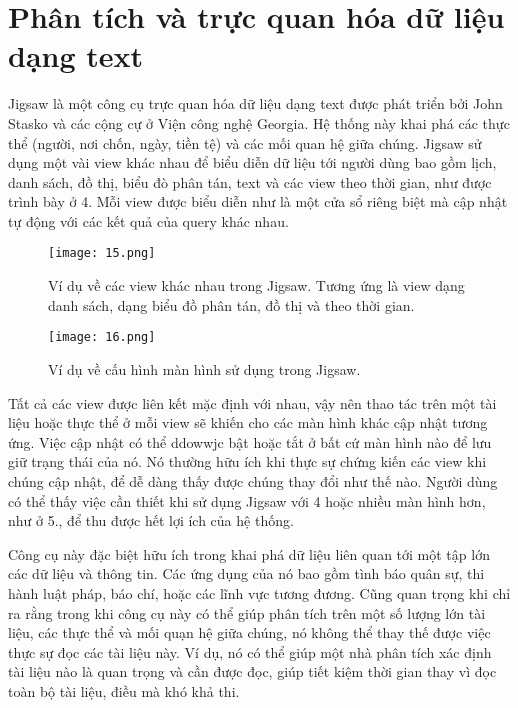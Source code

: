 \documentclass[13pt]{scrartcl} %
\begin{document}
\section{Phân tích và trực quan hóa dữ liệu dạng text}
Jigsaw là một công cụ trực quan hóa dữ liệu dạng text được phát triển bởi John Stasko và các cộng cự ở Viện công nghệ Georgia. Hệ thống này khai phá các thực thể (người, nơi chốn, ngày, tiền tệ) và các mối quan hệ giữa chúng. Jigsaw sử dụng một vài view khác nhau để biểu diễn dữ liệu tới người dùng bao gồm lịch, danh sách, đồ thị, biểu đò phân tán, text và các view theo thời gian, như được trình bày ở 4. Mỗi view được biểu diễn như là một cửa sổ riêng biệt mà cập nhật tự động với các kết quả của query khác nhau.


\begin{figure}[!ht] %
    \centering
    \texttt{[image: 15.png]}
    \caption{Ví dụ về các view khác nhau trong Jigsaw. Tương ứng là view dạng danh sách, dạng biểu đồ phân tán, đồ thị và theo thời gian.}
\end{figure}

\begin{figure}[!ht] %
    \centering
    \texttt{[image: 16.png]}
    \caption{Ví dụ về cấu hình màn hình sử dụng trong Jigsaw. }
\end{figure}

Tất cả các view được liên kết mặc định với nhau, vậy nên thao tác trên một tài liệu hoặc thực thể ở mỗi view sẽ khiến cho các màn hình khác cập nhật tương ứng. Việc cập nhật có thể ddowwjc bật hoặc tắt ở bất cứ màn hình nào để lưu giữ trạng thái của nó. Nó thường hữu ích khi thực sự chứng kiến các view khi chúng cập nhật, để dễ dàng thấy được chúng thay đổi như thế nào. Người dùng có thể thấy việc cần thiết khi sử dụng Jigsaw với 4 hoặc nhiều màn hình hơn, như ở 5., để thu được hết lợi ích của hệ thống.

Công cụ này đặc biệt hữu ích trong khai phá dữ liệu liên quan tới một tập lớn các dữ liệu và thông tin. Các ứng dụng của nó bao gồm tình báo quân sự, thi hành luật pháp, báo chí, hoặc các lĩnh vực tương đương. Cũng quan trọng khi chỉ ra rằng trong khi công cụ này có thể giúp phân tích trên một số lượng lớn tài liệu, các thực thể và mối quạn hệ giữa chúng, nó không thể thay thế được việc thực sự đọc các tài liệu này. Ví dụ, nó có thể giúp một nhà phân tích xác định tài liệu nào là quan trọng và cần được đọc, giúp tiết kiệm thời gian thay vì đọc toàn bộ tài liệu, điều mà khó khả thi.
\end{document}
